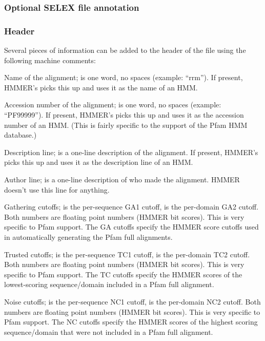 \subsubsection {Optional SELEX file annotation}

\subsubsection {Header}

Several pieces of information can be added to the header of the file
using the following machine comments:

\begin{wideitem}

\item [\emprog{\#=ID  <s>}]
Name of the alignment;  is one word, no spaces (example: ``rrm'').
If present, HMMER's  picks this up and uses it as the
name of an HMM.

\item [\emprog{\#=AC  <s>}]
Accession number of the alignment;  is one word, no spaces
(example: ``PF99999''). If present, HMMER's  picks this
up and uses it as the accession number of an HMM. (This is fairly
specific to the support of the Pfam HMM database.)

\item [\emprog{\#=DE  <s>}]
Description line;  is a one-line description of the
alignment. If present, HMMER's  picks this up and
uses it as the description line of an HMM.

\item [\emprog{\#=AU  <s>}]
Author line;   is a one-line description of who made the
alignment. HMMER doesn't use this line for anything.

\item [\emprog{\#=GA  <f1> <f2>}]
Gathering cutoffs;  is the per-sequence GA1 cutoff,
 is the per-domain GA2 cutoff. 
Both numbers are floating point numbers (HMMER bit scores).
This is very specific to Pfam support. The GA cutoffs specify
the HMMER score cutoffs used in automatically generating the
Pfam full alignments.

\item [\emprog{\#=TC  <f1> <f2>}]
Trusted cutoffs;  is the per-sequence TC1 cutoff,
 is the per-domain TC2 cutoff. 
Both numbers are floating point numbers (HMMER bit scores).
This is very specific to Pfam support. The TC cutoffs specify
the HMMER scores of the lowest-scoring sequence/domain included
in a Pfam full alignment.

\item [\emprog{\#=NC  <f1> <f2>}]
Noise cutoffs;  is the per-sequence NC1 cutoff,
 is the per-domain NC2 cutoff. 
Both numbers are floating point numbers (HMMER bit scores).
This is very specific to Pfam support. The NC cutoffs specify
the HMMER scores of the highest scoring sequence/domain that 
were not included in a Pfam full alignment.

\end{wideitem}

